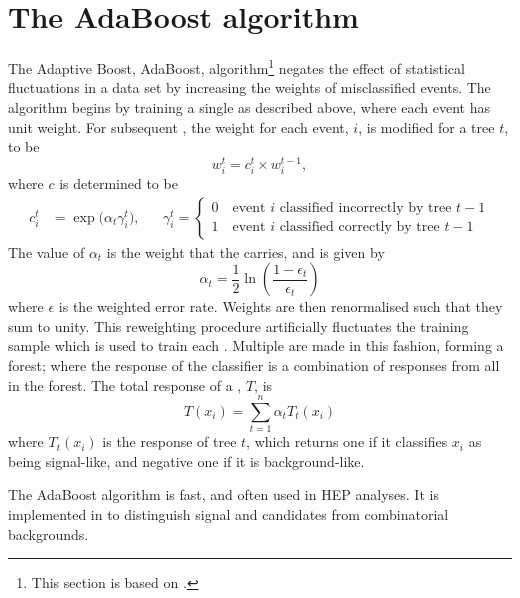 \section{The AdaBoost algorithm}
\label{sec:bdt:ada}
The Adaptive Boost, AdaBoost, algorithm\footnote{
  This section is based on .} negates the effect of statistical
fluctuations in a data set by increasing the weights of misclassified events.
The algorithm begins by training a single \DT as described above, where each event has unit weight.
For subsequent \DTs, the weight for each event, $i$, is modified for a tree $t$, to be
\begin{equation}
  w_i^t = c_i^t \times w_i^{t-1},
  \label{eq:ada:wt}
\end{equation}
where $c$ is determined to be
\begin{align}
  c_i^t &= \exp\big(\alpha_t\gamma_i^t\big),
  &&
  \gamma_i^t=\left\{
    \begin{array}{l}
      0\quad\text{event $i$ classified incorrectly by tree $t-1$} \\
      1\quad\text{event $i$ classified correctly by tree $t-1$}
    \end{array}
  \right.
\end{align}
The value of $\alpha_t$ is the weight that the \DT carries, and is given by
\begin{equation}
  \alpha_t = \frac12\ln\left(\frac{1-\epsilon_t}{\epsilon_t}\right)
\end{equation}
where $\epsilon$ is the weighted error rate.
Weights are then renormalised such that they sum to unity.
This reweighting procedure artificially fluctuates the training sample which is used to train
each \DT.
Multiple \DTs are made in this fashion, forming a forest; where the response of the \BDT classifier
is a combination of responses from all \DTs in the forest.
The total response of a \BDT, $T$, is
\begin{equation}
  T(x_i) = \sum_{t=1}^{n} \alpha_tT_t(x_i)
  \label{eq:ada:fullbdt}
\end{equation}
where $T_t(x_i)$ is the response of tree $t$, which returns one if it classifies $x_i$ as being
signal-like, and negative one if it is background-like.

The AdaBoost algorithm is fast, and often used in \gls{HEP} analyses.
It is implemented in  to distinguish signal \btokpipimumu and \btophikmumu candidates
from combinatorial backgrounds.


